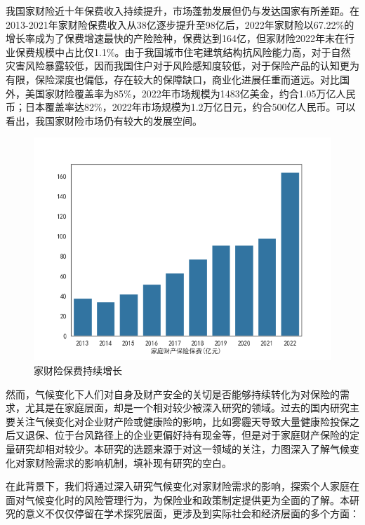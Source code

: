 我国家财险近十年保费收入持续提升，市场蓬勃发展但仍与发达国家有所差距。在2013-2021年家财险保费收入从38亿逐步提升至98亿后，2022年家财险以67.22\%的增长率成为了保费增速最快的产险险种，保费达到164亿，但家财险2022年末在行业保费规模中占比仅1.1\%。由于我国城市住宅建筑结构抗风险能力高，对于自然灾害风险暴露较低，因而我国住户对于风险感知度较低，对于保险产品的认知更为有限，保险深度也偏低，存在较大的保障缺口，商业化进展任重而道远。对比国外，美国家财险覆盖率为85\%\citep{croll2018home}，2022年市场规模为1483亿美金，约合1.05万亿人民币；日本覆盖率达82\%\citep{plaza}，2022年市场规模为1.2万亿日元，约合500亿人民币。可以看出，我国家财险市场仍有较大的发展空间。
\begin{figure}[H]
    \centering
    \includegraphics[width=\linewidth]{img/家庭财产保险保费.png}
    \caption{家财险保费持续增长}
\end{figure}

然而，气候变化下人们对自身及财产安全的关切是否能够持续转化为对保险的需求，尤其是在家庭层面，却是一个相对较少被深入研究的领域。过去的国内研究主要关注气候变化对企业财产险或健康险的影响，比如雾霾天导致大量健康险投保之后又退保、位于台风路径上的企业更偏好持有现金\citep{杨娜娜2019自然灾害与企业现金持有}等，但是对于家庭财产保险的定量研究却相对较少。本研究的选题来源于对这一领域的关注，力图深入了解气候变化对家财险需求的影响机制，填补现有研究的空白。

在此背景下，我们将通过深入研究气候变化对家财险需求的影响，探索个人家庭在面对气候变化时的风险管理行为，为保险业和政策制定提供更为全面的了解。本研究的意义不仅仅停留在学术探究层面，更涉及到实际社会和经济层面的多个方面：

